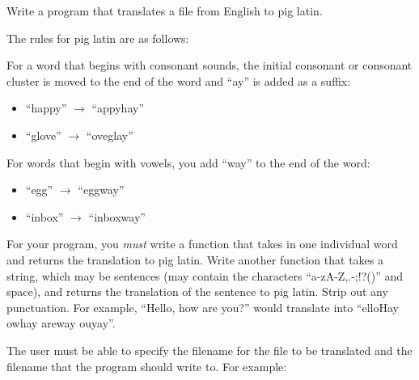 \documentclass[11pt]{cselabheader}
\begin{document}
\begin{ex}[piglatin.py] Write a program that translates a file from English to
  pig latin.

  The rules for pig latin are as follows:

  For a word that begins with consonant sounds, the initial consonant or
  consonant cluster is moved to the end of the word and ``ay'' is added as a
  suffix:
  \begin{itemize}
    \item ``happy'' $\to$ ``appyhay''
    \item ``glove'' $\to$ ``oveglay''
  \end{itemize}

  For words that begin with vowels, you add ``way'' to the end of the word:
  \begin{itemize}
    \item ``egg'' $\to$ ``eggway''
    \item ``inbox'' $\to$ ``inboxway''
  \end{itemize}

  For your program, you \emph{must} write a function that takes in one
  individual word and returns the translation to pig latin. Write another
  function that takes a string, which may be sentences (may contain the
  characters ``a-zA-Z,.-;!?()'' and space), and returns the translation of the
  sentence to pig latin. Strip out any punctuation. For example, ``Hello, how
  are you?'' would translate into ``elloHay owhay areway ouyay''.

  The user must be able to specify the filename for the file to be translated
  and the filename that the program should write to. For example:

\end{ex}
\end{document}
